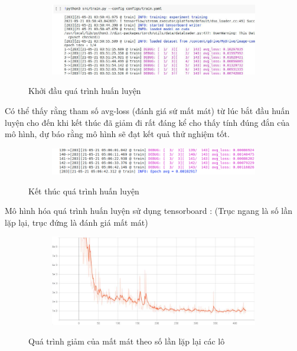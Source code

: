 \begin{figure}
    \begin{subfigure}{0.8\textwidth}
        \includegraphics[width=1.\linewidth]{Chapters/items/colab1.jpg}

        \label{fig: colab1}
    \end{subfigure}
    \caption{Khởi đầu quá trình huấn luyện}
\end{figure}

\newpage
Có thể thấy rằng tham số avg-loss (đánh giá sứ mất mát) từ lúc
bắt đầu huấn luyện cho đến khi kết thúc đã giảm đi rất đáng kể
cho thấy tính đúng đắn của mô hình, dự báo rằng mô hình sẽ đạt kết
quả thử nghiệm tốt.

\begin{figure}
    \begin{subfigure}{0.8\textwidth}
        \includegraphics[width=1.\linewidth]{Chapters/items/colab2.jpg}

        \label{fig: colab2}
    \end{subfigure}
    \caption{Kết thúc quá trình huấn luyện}
\end{figure}

Mô hình hóa quá trình huấn luyện sử dụng tensorboard :
(Trục ngang là số lần lặp lại, trục đứng là đánh giá mất mát)

\begin{figure}
    \begin{subfigure}{0.8\textwidth}
        \includegraphics[width=1.\linewidth]{Chapters/items/visualizeTraining.jpg}

        \label{fig: visualize}
    \end{subfigure}
    \caption{Quá trình giảm của mất mát theo số lần lặp lại các lô}
\end{figure}


